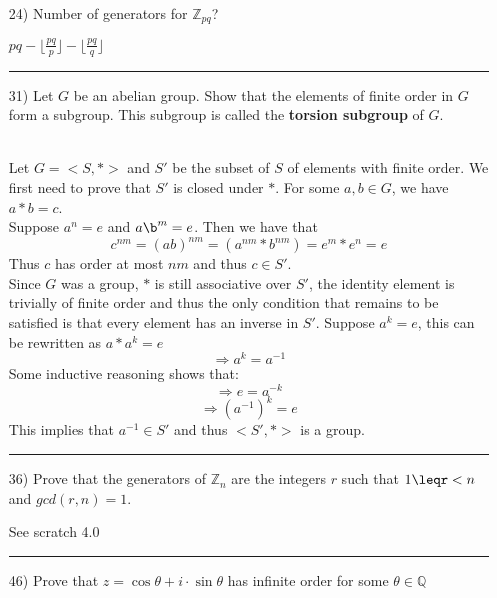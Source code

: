 \documentclass[11pt]{article}
\begin{document}
\begin{itemize}
\begin{itemize}
    \end{itemize}
    \vspace{6pt}
    \hrule
    \vspace{6pt}
    \item[24)] Number of generators for $\mathbb{Z}_{pq}$?
    \begin{solution}
        $pq - \lfloor\frac{pq}{p}\rfloor - \lfloor\frac{pq}{q}\rfloor$
    \end{solution}
    \vspace{6pt}
    \hrule
    \vspace{6pt}
    \item[31)] Let $G$ be an abelian group. Show that the elements of finite order in $G$ form a subgroup. This subgroup is called the \textbf{torsion subgroup} of $G$.
    \begin{solution} \hfill \\
        Let $G=<S,*>$ and $S'$ be the subset of $S$ of elements with finite order. We first need to prove that $S'$ is closed under $*$. For some $a, b\in G$, we have $a*b=c$.\\
        Suppose $a^n=e$ and $a\b^m=e$. Then we have that
        $$c^{nm}=(ab)^{nm}=\left(a^{nm}*b^{nm}\right)=e^m*e^n=e$$
        Thus $c$ has order at most $nm$ and thus $c\in S'$.\\
        Since $G$ was a group, $*$ is still associative over $S'$, the identity element is trivially of finite order and thus the only condition that remains to be satisfied is that every element has an inverse in $S'$.
        Suppose $a^k=e$, this can be rewritten as $a*a^k=e$
        $$\Rightarrow a^k=a^{-1}$$
        Some inductive reasoning shows that:
        $$\Rightarrow e=a^{-k}$$
        $$\Rightarrow \left(a^{-1}\right)^k = e$$
        This implies that $a^{-1}\in S'$ and thus $<S', *>$ is a group.
    \end{solution}
    \vspace{6pt}
    \hrule
    \vspace{6pt}
    \item[36)] Prove that the generators of $\mathbb{Z}_n$ are the integers $r$ such that $1\leqr<n$ and $gcd(r,n)=1$.
    \begin{solution} See scratch 4.0
    \end{solution}
    \vspace{6pt}
    \hrule
    \vspace{6pt}
    \item[46)] Prove that $z=\cos\theta + i\cdot \sin\theta$ has infinite order for some $\theta \in \mathbb{Q}$\\

\end{itemize}
\end{document}
